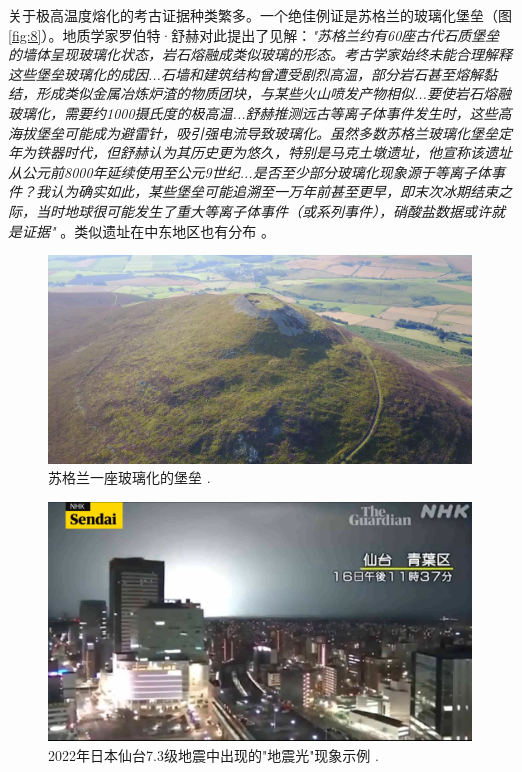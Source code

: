 \documentclass[10pt,twocolumn,letterpaper]{article}
\begin{document}
关于极高温度熔化的考古证据种类繁多。一个绝佳例证是苏格兰的玻璃化堡垒（图\ref{fig:8}）。地质学家罗伯特·舒赫对此提出了见解：\textit{"苏格兰约有60座古代石质堡垒的墙体呈现玻璃化状态，岩石熔融成类似玻璃的形态。考古学家始终未能合理解释这些堡垒玻璃化的成因...石墙和建筑结构曾遭受剧烈高温，部分岩石甚至熔解黏结，形成类似金属冶炼炉渣的物质团块，与某些火山喷发产物相似...要使岩石熔融玻璃化，需要约1000摄氏度的极高温...舒赫推测远古等离子体事件发生时，这些高海拔堡垒可能成为避雷针，吸引强电流导致玻璃化。虽然多数苏格兰玻璃化堡垒定年为铁器时代，但舒赫认为其历史更为悠久，特别是马克土墩遗址，他宣称该遗址从公元前8000年延续使用至公元9世纪...是否至少部分玻璃化现象源于等离子体事件？我认为确实如此，某些堡垒可能追溯至一万年前甚至更早，即末次冰期结束之际，当时地球很可能发生了重大等离子体事件（或系列事件），硝酸盐数据或许就是证据"} \cite{18,19}。类似遗址在中东地区也有分布 \cite{20,21}。
\begin{figure}[t]
\begin{center}
   \includegraphics[width=1\linewidth]{vitrified.jpeg}
\end{center}
   \caption{苏格兰一座玻璃化的堡垒 \cite{51,52}.}
\label{fig:8}
\label{fig:onecol}
\end{figure}

\begin{figure}[t]
\begin{center}
   \includegraphics[width=1\linewidth]{sendai.png}
\end{center}
   \caption{2022年日本仙台7.3级地震中出现的"地震光"现象示例 \cite{48}.}
\label{fig:9}
\label{fig:onecol}
\end{figure}
\end{document}
